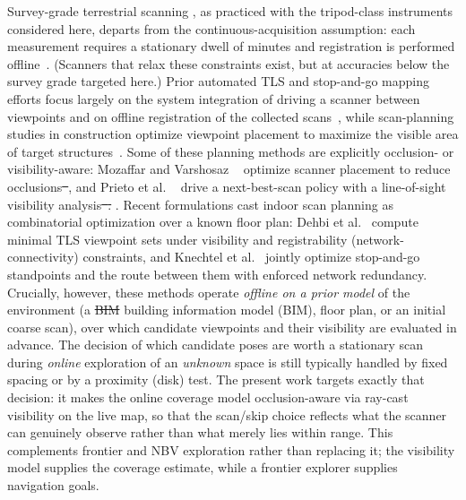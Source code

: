 \documentclass[sensors,article,submit,pdftex,moreauthors]{Definitions/mdpi}
\providecommand{\DIFadd}[1]{{\protect\color{blue} \sf #1}} %
\providecommand{\DIFdel}[1]{{\protect\color{red}\protect\scriptsize\protect\sout{#1}}} %
\providecommand{\DIFaddbegin}{} %
\providecommand{\DIFaddend}{} %
\providecommand{\DIFdelbegin}{} %
\providecommand{\DIFdelend}{} %
\begin{document}
Survey-grade terrestrial scanning\DIFaddbegin \DIFadd{, as practiced with the tripod-class
instruments considered here, }\DIFaddend departs from the continuous-acquisition
assumption: each measurement requires a stationary dwell of minutes and
registration is performed offline~\cite{stopandgo-review}. \DIFaddbegin \DIFadd{(Scanners that
relax these constraints exist, but at accuracies below the survey grade
targeted here.) }\DIFaddend Prior automated TLS
and stop-and-go mapping efforts focus largely on the system integration of
driving a scanner between viewpoints and on offline registration of the
collected scans~\cite{stopandgo-registration}, while scan-planning studies in
construction optimize viewpoint placement to maximize the visible area of target
structures~\cite{tls-scanplanning}. Some of these planning methods are
explicitly occlusion- or visibility-aware: Mozaffar and
Varshosaz\DIFaddbegin \DIFadd{~\cite{mozaffar2016occlusion} }\DIFaddend optimize scanner placement to reduce
occlusions\DIFdelbegin \DIFdel{~\cite{mozaffar2016occlusion}}\DIFdelend , and Prieto et al.\DIFaddbegin \DIFadd{~\cite{prieto2017nbs} }\DIFaddend drive a next-best-scan
policy with a line-of-sight visibility analysis\DIFdelbegin \DIFdel{~\cite{prieto2017nbs}.}\DIFdelend \DIFaddbegin \DIFadd{. Recent formulations cast
indoor scan planning as combinatorial optimization over a known floor plan:
Dehbi et al.~\cite{dehbi2021} compute minimal TLS viewpoint sets under
visibility and registrability (network-connectivity) constraints, and Knechtel
et al.~\cite{knechtel2025} jointly optimize stop-and-go standpoints and the
route between them with enforced network redundancy. }\DIFaddend Crucially, however, these
methods operate \emph{offline on a prior model} of the environment (a \DIFdelbegin \DIFdel{BIM}\DIFdelend \DIFaddbegin \DIFadd{building
information model (BIM)}\DIFaddend , floor plan, or an initial coarse scan), over which
candidate viewpoints and their visibility are evaluated in advance. The decision of which candidate poses are worth a
stationary scan during \emph{online} exploration of an \emph{unknown} space is
still typically handled by fixed spacing or by a proximity (disk) test. The
present work targets exactly that decision: it makes the online coverage model
occlusion-aware via ray-cast visibility on the live map, so that the scan/skip
choice reflects what the scanner can genuinely observe rather than what merely
lies within range. This complements frontier and NBV exploration rather than
replacing it; the visibility model supplies the coverage estimate, while a
frontier explorer supplies navigation goals.
\end{document}
